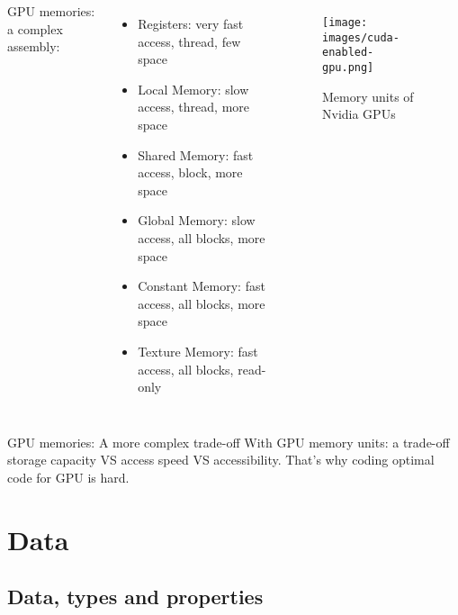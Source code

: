 \documentclass[handout]{beamer}[10pt, usepdftitle=false]
\begin{document}
	\begin{frame}
	\begin{columns}[c]
	GPU memories: a complex assembly:
	\begin{itemize}
		\item{Registers: very fast access, thread, few space}
		\item{Local Memory: slow access, thread, more space}
		\item{Shared Memory: fast access, block, more space}
		\item{Global Memory: slow access, all blocks, more space}
		\item{Constant Memory: fast access, all blocks, more space}
		\item{Texture Memory: fast access, all blocks, read-only}
	\end{itemize} 		
	
		\begin{figure}
		\texttt{[image: images/cuda-enabled-gpu.png]} 
     	\vspace*{-0.5em}
		\caption{Memory units of Nvidia GPUs}
		 \end{figure}
	\end{columns}
	\begin{block}{GPU memories: A more complex trade-off}
	With GPU memory units: a trade-off storage capacity VS access speed VS accessibility. That's why coding optimal code for GPU is hard.	\end{block}
	
	\end{frame}	
	
	\section{Data}	
	
	\subsection{Data, types and properties}	
\end{document}

